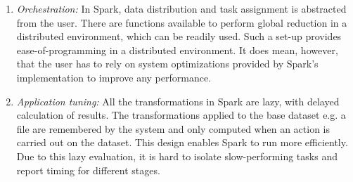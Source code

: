 \documentclass[11pt, twocolumn]{article}
\begin{document}
\begin{enumerate}
\item \textit{Orchestration: } 
In Spark, data distribution and task assignment
  is abstracted from the user. There are functions available to
  perform global reduction in a distributed environment, which can be
  readily used.  Such a set-up provides ease-of-programming in a
  distributed environment. It does mean, however, that the user has to
  rely on system optimizations provided by Spark's implementation to
  improve any performance.
% 
\item \textit{Application tuning: } All the transformations in Spark
  are lazy, with delayed calculation of results. The transformations
  applied to the base dataset e.g. a file are remembered by the system
  and only computed when an action is carried out on the dataset.
  This design enables Spark to run more efficiently. 
  Due to this lazy evaluation, it is hard to isolate slow-performing tasks and report
  timing for different stages. 

%
%

\end{enumerate}
\end{document}
